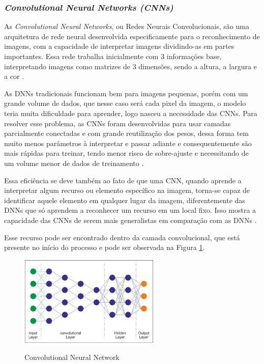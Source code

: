 \subsubsection{\emph{Convolutional Neural Networks (CNNs)}}
\label{sec:cnn}
As \emph{Convolutional Neural Networks}, ou Redes Neurais Convolucionais, são uma arquitetura de rede neural desenvolvida especificamente para o reconhecimento de imagens, com a capacidade de interpretar imagens dividindo-as em partes importantes. Essa rede trabalha inicialmente com 3 informações base, interpretando imagens como matrizes de 3 dimensões, sendo a altura, a largura e a cor \cite{deepLearningTensorFlow}.

As DNNs tradicionais funcionam bem para imagens pequenas, porém com um grande volume de dados, que nesse caso será cada pixel da imagem, o modelo teria muita dificuldade para aprender, logo nasceu a necessidade das CNNs. Para resolver esse problema, as CNNs foram desenvolvidas para usar camadas parcialmente conectadas e com grande reutilização dos pesos, dessa forma tem muito menos parâmetros à interpretar e passar adiante e consequentemente são mais rápidas para treinar, tendo menor risco de sobre-ajuste e necessitando de um volume menor de dados de treinamento \cite{deepLearningTensorFlow}.

Essa eficiência se deve também ao fato de que uma CNN, quando aprende a interpretar algum recurso ou elemento específico na imagem, torna-se capaz de identificar aquele elemento em qualquer lugar da imagem, diferentemente das DNNs que só aprendem a reconhecer um recurso em um local fixo. Isso mostra a capacidade das CNNs de serem mais generalistas em comparação com as DNNs \cite{deepLearningTensorFlow}.

Esse recurso pode ser encontrado dentro da camada convolucional, que está presente no início do processo e pode ser observada na Figura \ref{fig:cnn}. 

\begin{figure}[!htb]
	\centering
	\caption{Convolutional Neural Network}
	\includegraphics[width=0.60\textwidth]{img/cnn.jpg}
	\label{fig:cnn}
\end{figure}

